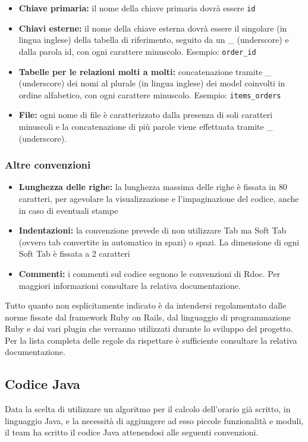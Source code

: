 \documentclass[11pt,a4paper]{article}
\begin{document}
\begin{itemize}
\item\textbf{Chiave primaria:}
il nome della chiave primaria dovrà essere \texttt{id}
\item\textbf{Chiavi esterne:}
il nome della chiave esterna dovrà essere il singolare (in lingua inglese) della tabella di riferimento, seguito da un \_ (underscore) e dalla parola id, con ogni carattere minuscolo. Esempio: \texttt{order\_id}
\item\textbf{Tabelle per le relazioni molti a molti:}
concatenazione tramite \_ (underscore) dei nomi al plurale (in lingua inglese) dei model coinvolti in ordine alfabetico, con ogni carattere minuscolo. Esempio: \texttt{items\_orders}
\item\textbf{File:}
ogni nome di file è caratterizzato dalla presenza di soli caratteri minuscoli e la concatenazione di più parole viene effettuata tramite \_ (underscore).
\end{itemize}
\subsubsection{Altre convenzioni}
\begin{itemize}
\item\textbf{Lunghezza delle righe:} la lunghezza massima delle righe è fissata in 80 caratteri, per agevolare la visualizzazione e l'impaginazione del codice, anche in caso di eventuali stampe
\item\textbf{Indentazioni:} la convenzione prevede di non utilizzare Tab ma Soft Tab (ovvero tab convertite in automatico in spazi) o spazi. La dimensione di ogni Soft Tab è fissata a 2 caratteri
\item\textbf{Commenti:} i commenti sul codice seguono le convenzioni di Rdoc. Per maggiori
informazioni consultare la relativa documentazione.
\end{itemize}



Tutto quanto non esplicitamente indicato è da intendersi regolamentato dalle norme fissate dal framework Ruby on Rails, dal linguaggio di programmazione Ruby e dai vari plugin che verranno utilizzati durante lo sviluppo del progetto.
Per la lista completa delle regole da rispettare è sufficiente consultare la relativa documentazione.

\subsection{Codice Java}
Data la scelta di utilizzare un algoritmo per il calcolo dell'orario già scritto, in linguaggio Java, e la necessità di aggiungere ad esso piccole funzionalità e moduli, il team ha scritto il codice Java attenendosi alle seguenti convenzioni.
\end{document}

